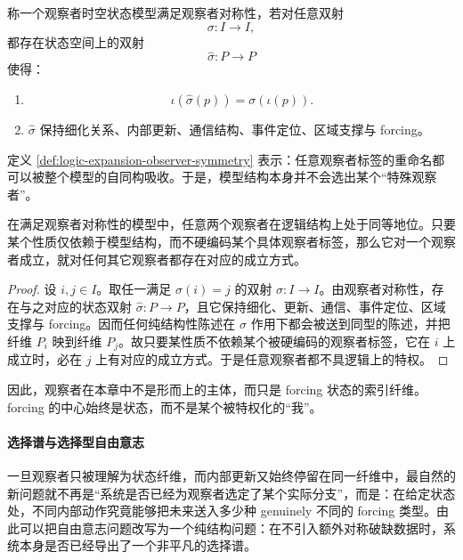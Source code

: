 \begin{definition}[观察者对称性]\label{def:logic-expansion-observer-symmetry}
称一个观察者时空状态模型满足观察者对称性，若对任意双射
\[
\sigma:I\to I,
\]
都存在状态空间上的双射
\[
\widehat{\sigma}:P\to P
\]
使得：
\begin{enumerate}
  \item
  \[
  \iota(\widehat{\sigma}(p))=\sigma(\iota(p)).
  \]
  \item \(\widehat{\sigma}\) 保持细化关系、内部更新、通信结构、事件定位、区域支撑与 forcing。
\end{enumerate}
\end{definition}

定义 \ref{def:logic-expansion-observer-symmetry} 表示：任意观察者标签的重命名都可以被整个模型的自同构吸收。于是，模型结构本身并不会选出某个“特殊观察者”。

\begin{proposition}[无特权观察者]\label{prop:logic-expansion-no-privileged-observer}
在满足观察者对称性的模型中，任意两个观察者在逻辑结构上处于同等地位。只要某个性质仅依赖于模型结构，而不硬编码某个具体观察者标签，那么它对一个观察者成立，就对任何其它观察者都存在对应的成立方式。
\end{proposition}

\begin{proof}
设 \(i,j\in I\)。取任一满足 \(\sigma(i)=j\) 的双射 \(\sigma:I\to I\)。由观察者对称性，存在与之对应的状态双射 \(\widehat{\sigma}:P\to P\)，且它保持细化、更新、通信、事件定位、区域支撑与 forcing。因而任何纯结构性陈述在 \(\widehat{\sigma}\) 作用下都会被送到同型的陈述，并把纤维 \(P_i\) 映到纤维 \(P_j\)。故只要某性质不依赖某个被硬编码的观察者标签，它在 \(i\) 上成立时，必在 \(j\) 上有对应的成立方式。于是任意观察者都不具逻辑上的特权。
\end{proof}

因此，观察者在本章中不是形而上的主体，而只是 forcing 状态的索引纤维。forcing 的中心始终是状态，而不是某个被特权化的“我”。

\paragraph{选择谱与选择型自由意志}
一旦观察者只被理解为状态纤维，而内部更新又始终停留在同一纤维中，最自然的新问题就不再是“系统是否已经为观察者选定了某个实际分支”，而是：在给定状态处，不同内部动作究竟能够把未来送入多少种 genuinely 不同的 forcing 类型。由此可以把自由意志问题改写为一个纯结构问题：在不引入额外对称破缺数据时，系统本身是否已经导出了一个非平凡的选择谱。

